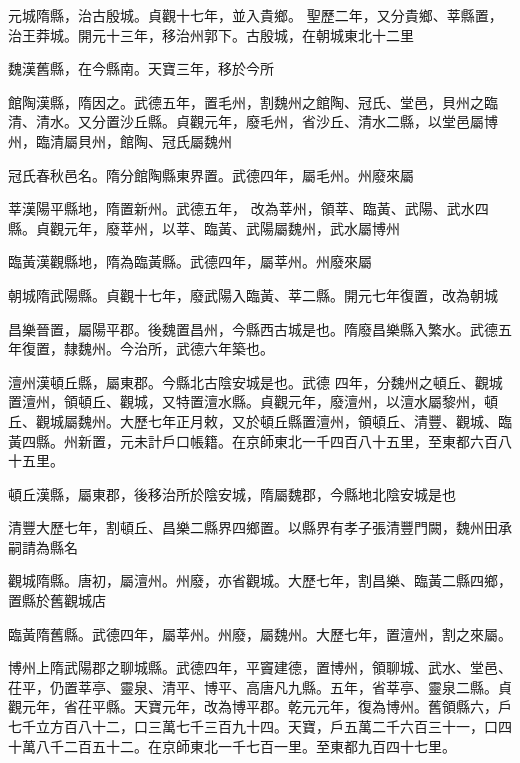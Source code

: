 \begin{pinyinscope}
 元城隋縣，治古殷城。貞觀十七年，並入貴鄉。
 聖歷二年，又分貴鄉、莘縣置，治王莽城。開元十三年，移治州郭下。古殷城，在朝城東北十二里



 魏漢舊縣，在今縣南。天寶三年，移於今所



 館陶漢縣，隋因之。武德五年，置毛州，割魏州之館陶、冠氏、堂邑，貝州之臨清、清水。又分置沙丘縣。貞觀元年，廢毛州，省沙丘、清水二縣，以堂邑屬博州，臨清屬貝州，館陶、冠氏屬魏州



 冠氏春秋邑名。隋分館陶縣東界置。武德四年，屬毛州。州廢來屬



 莘漢陽平縣地，隋置新州。武德五年，
 改為莘州，領莘、臨黃、武陽、武水四縣。貞觀元年，廢莘州，以莘、臨黃、武陽屬魏州，武水屬博州



 臨黃漢觀縣地，隋為臨黃縣。武德四年，屬莘州。州廢來屬



 朝城隋武陽縣。貞觀十七年，廢武陽入臨黃、莘二縣。開元七年復置，改為朝城



 昌樂晉置，屬陽平郡。後魏置昌州，今縣西古城是也。隋廢昌樂縣入繁水。武德五年復置，隸魏州。今治所，武德六年築也。



 澶州漢頓丘縣，屬東郡。今縣北古陰安城是也。武德
 四年，分魏州之頓丘、觀城置澶州，領頓丘、觀城，又特置澶水縣。貞觀元年，廢澶州，以澶水屬黎州，頓丘、觀城屬魏州。大歷七年正月敕，又於頓丘縣置澶州，領頓丘、清豐、觀城、臨黃四縣。州新置，元未計戶口帳籍。在京師東北一千四百八十五里，至東都六百八十五里。



 頓丘漢縣，屬東郡，後移治所於陰安城，隋屬魏郡，今縣地北陰安城是也



 清豐大歷七年，割頓丘、昌樂二縣界四鄉置。以縣界有孝子張清豐門闕，魏州田承
 嗣請為縣名



 觀城隋縣。唐初，屬澶州。州廢，亦省觀城。大歷七年，割昌樂、臨黃二縣四鄉，置縣於舊觀城店



 臨黃隋舊縣。武德四年，屬莘州。州廢，屬魏州。大歷七年，置澶州，割之來屬。



 博州上隋武陽郡之聊城縣。武德四年，平竇建德，置博州，領聊城、武水、堂邑、茌平，仍置莘亭、靈泉、清平、博平、高唐凡九縣。五年，省莘亭、靈泉二縣。貞觀元年，省茌平縣。天寶元年，改為博平郡。乾元元年，復為博州。舊領縣六，戶
 七千立方百八十二，口三萬七千三百九十四。天寶，戶五萬二千六百三十一，口四十萬八千二百五十二。在京師東北一千七百一里。至東都九百四十七里。




\end{pinyinscope}
